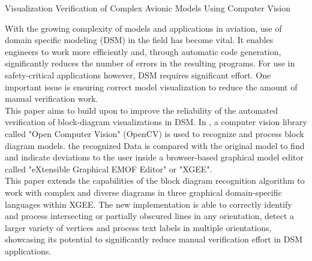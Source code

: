 \label{abstract}
{\LARGE Visualization Verification of Complex Avionic Models Using Computer Vision}

With the growing complexity of models and applications in aviation, use of domain specific modeling (DSM) in the field has become vital. It enables engineers to work more efficiently and, through automatic code generation, significantly reduces the number of errors in the resulting programs. For use in safety-critical applications however, DSM requires significant effort. One important issue is ensuring correct model visualization to reduce the amount of manual verification work.\\
This paper aims to build upon \cite{og_paper} to improve the reliability of the automated verification of block-diagram visualizations in DSM. In \cite{og_paper}, a computer vision library called "Open Computer Vision" (OpenCV) is used to recognize and process block diagram models. the recognized Data is compared with the original model to find and indicate deviations to the user inside a browser-based graphical model editor called "eXtensible Graphical EMOF Editor" or "XGEE".\\
This paper extends the capabilities of the block diagram recognition algorithm to work with complex and diverse diagrams in three graphical domain-specific languages within XGEE. The new implementation is able to correctly identify and process intersecting or partially obscured lines in any orientation, detect a larger variety of vertices and process text labels in multiple orientations, showcasing its potential to significantly reduce manual verification effort in DSM applications.